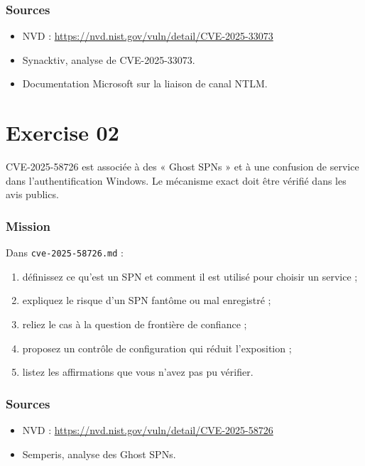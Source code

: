 \documentclass{training}
\begin{document}
\subsection*{Sources}
\begin{itemize}
  \item NVD : \url{https://nvd.nist.gov/vuln/detail/CVE-2025-33073}
  \item Synacktiv, analyse de CVE-2025-33073.
  \item Documentation Microsoft sur la liaison de canal NTLM.
\end{itemize}

\chapter{Exercise 02}
\makeheaderfiles

CVE-2025-58726 est associée à des « Ghost SPNs » et à une confusion de
service dans l'authentification Windows. Le mécanisme exact doit être
vérifié dans les avis publics.

\subsection*{Mission}

Dans \texttt{cve-2025-58726.md} :

\begin{enumerate}
  \item définissez ce qu'est un SPN et comment il est utilisé pour choisir
        un service ;
  \item expliquez le risque d'un SPN fantôme ou mal enregistré ;
  \item reliez le cas à la question de frontière de confiance ;
  \item proposez un contrôle de configuration qui réduit l'exposition ;
  \item listez les affirmations que vous n'avez pas pu vérifier.
\end{enumerate}

\subsection*{Sources}
\begin{itemize}
  \item NVD : \url{https://nvd.nist.gov/vuln/detail/CVE-2025-58726}
  \item Semperis, analyse des Ghost SPNs.
\end{itemize}
\end{document}
